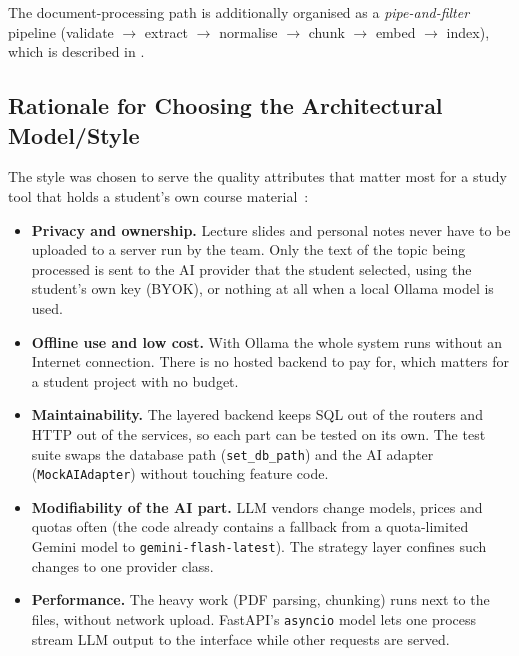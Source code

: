 The document-processing path is additionally organised as a \emph{pipe-and-filter}
pipeline (validate $\rightarrow$ extract $\rightarrow$ normalise $\rightarrow$ chunk
$\rightarrow$ embed $\rightarrow$ index), which is described in .

\subsection{Rationale for Choosing the Architectural Model/Style}\label{sec:arch_rationale}

The style was chosen to serve the quality attributes that matter most for a study tool
that holds a student's own course material~\cite{bass2021}:

\begin{itemize}[leftmargin=*]
  \item \textbf{Privacy and ownership.} Lecture slides and personal notes never have to
    be uploaded to a server run by the team. Only the text of the topic being processed
    is sent to the AI provider that the student selected, using the student's own key
    (BYOK), or nothing at all when a local Ollama model is used.
  \item \textbf{Offline use and low cost.} With Ollama the whole system runs without an
    Internet connection. There is no hosted backend to pay for, which matters for a
    student project with no budget.
  \item \textbf{Maintainability.} The layered backend keeps SQL out of the routers and
    HTTP out of the services, so each part can be tested on its own. The test suite
    swaps the database path (\texttt{set\_db\_path}) and the AI adapter
    (\texttt{MockAIAdapter}) without touching feature code.
  \item \textbf{Modifiability of the AI part.} LLM vendors change models, prices and
    quotas often (the code already contains a fallback from a quota-limited Gemini
    model to \texttt{gemini-flash-latest}). The strategy layer confines such changes to
    one provider class.
  \item \textbf{Performance.} The heavy work (PDF parsing, chunking) runs next to the
    files, without network upload. FastAPI's \texttt{asyncio} model lets one process
    stream LLM output to the interface while other requests are served.
\end{itemize}

